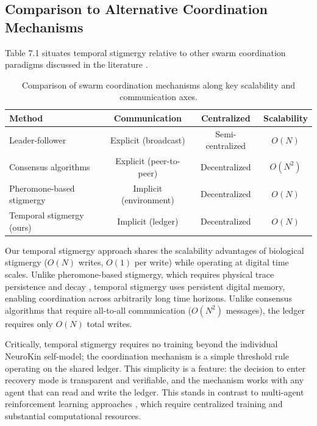\documentclass[12pt,a4paper,oneside]{report}
\begin{document}
\subsection{Comparison to Alternative Coordination Mechanisms}

Table 7.1 situates temporal stigmergy relative to other swarm coordination paradigms discussed in the literature \cite{bongard2006resilient, cully2015robots, domberg2026selfadapting}.

\begin{table}[H]
\centering
\caption{Comparison of swarm coordination mechanisms along key scalability and communication axes.}
\label{tab:coordination_comparison}
\begin{tabular}{lccc}
\toprule
\textbf{Method} & \textbf{Communication} & \textbf{Centralized} & \textbf{Scalability} \\
\midrule
Leader-follower & Explicit (broadcast) & Semi-centralized & $O(N)$ \\
Consensus algorithms & Explicit (peer-to-peer) & Decentralized & $O(N^2)$ \\
Pheromone-based stigmergy & Implicit (environment) & Decentralized & $O(N)$ \\
Temporal stigmergy (ours) & Implicit (ledger) & Decentralized & $O(N)$ \\
\bottomrule
\end{tabular}
\end{table}

Our temporal stigmergy approach shares the scalability advantages of biological stigmergy ($O(N)$ writes, $O(1)$ per write) while operating at digital time scales. Unlike pheromone-based stigmergy, which requires physical trace persistence and decay \cite{bongard2006resilient}, temporal stigmergy uses persistent digital memory, enabling coordination across arbitrarily long time horizons. Unlike consensus algorithms that require all-to-all communication ($O(N^2)$ messages), the ledger requires only $O(N)$ total writes.

Critically, temporal stigmergy requires no training beyond the individual NeuroKin self-model; the coordination mechanism is a simple threshold rule operating on the shared ledger. This simplicity is a feature: the decision to enter recovery mode is transparent and verifiable, and the mechanism works with any agent that can read and write the ledger. This stands in contrast to multi-agent reinforcement learning approaches \cite{domberg2026selfadapting, daneshmand2026slowrl}, which require centralized training and substantial computational resources.
\end{document}
